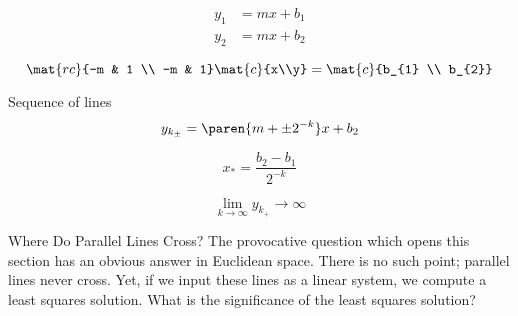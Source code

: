   \begin{equation*}   %
    \begin{split}
      y_{1} &= mx + b_{1} \\
      y_{2} &= mx + b_{2}
    \end{split}
  \end{equation*}

  \begin{equation*}   %
    \mat{rc}{-m & 1 \\ -m & 1} \mat{c}{x\\y} = \mat{c}{b_{1} \\ b_{2}}
  \end{equation*}
  
  Sequence of lines
  \begin{equation*}   %
    y_{k_{\pm}} = \paren{m + \pm 2^{-k}}x + b_{2}
  \end{equation*}

  \begin{equation*}   %
    x_{*} = \frac{b_{2} - b_{1}} {2^{-k}}
  \end{equation*}

  \begin{equation*}   %
    \lim_{k\to\infty} y_{k_{+}} \to \infty
  \end{equation*}

Where Do Parallel Lines Cross? The provocative question which opens this section has an obvious answer in Euclidean space. There is no such point; parallel lines never cross. Yet, if we input these lines as a linear system, we compute a least squares solution. What is the significance of the least squares solution?

